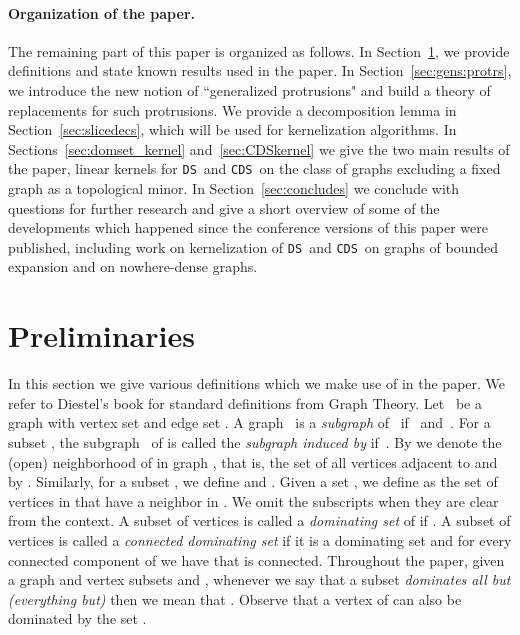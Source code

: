 \documentclass[11pt]{article}
\newcommand{\tDS}{{\texttt{\sc DS}}}
\newcommand{\tCDS}{{\texttt{\sc CDS}}}
\begin{document}
\paragraph{Organization of the paper.}
The remaining part of this paper is organized as follows.
In Section~\ref{sec:defs_and_nots}, we provide definitions and  state known results used in the paper. In Section~\ref{sec:gens:protrs}, we introduce the new notion of ``generalized protrusions" and build a theory of  replacements for such protrusions. 
We provide a decomposition lemma in Section~\ref{sec:slicedecs}, which will be used  for kernelization algorithms. In Sections~\ref{sec:domset_kernel} and~\ref{sec:CDSkernel} we give the two main results of the paper, linear kernels for \tDS\ and \tCDS\ on  the class of graphs excluding a fixed graph  as a topological minor. In Section~\ref{sec:concludes}  we conclude with questions for further research and give a  short overview of some of the developments which happened since the conference versions of this paper were published, including work on  kernelization of \tDS\ and \tCDS\ on graphs of bounded expansion and on nowhere-dense graphs. 


\section{Preliminaries}
\label{sec:defs_and_nots}


In this section we give various definitions which we make use of in the paper. We refer to Diestel's book 
\cite{diestelbook} for standard definitions from Graph Theory.
 Let~ be a graph with vertex set  and edge set .  A graph~ is a
 \emph{subgraph} of~ if~ and~.
 For a subset , the subgraph~ of  is called the   \emph{subgraph induced  by }  if~.
By 
we denote the (open) neighborhood of  in graph , that is, the set of all vertices
adjacent to  and by . 
Similarly, for a subset , we define 
and .  Given a set , we define  as the set of vertices in 
 that have a neighbor in .  We omit the subscripts when they are clear from the context. A subset of vertices  is called a {\em dominating set} of  if 
. A subset of vertices   is called a {\em connected dominating set} if it is a dominating set and for every connected component  of  we have that  is connected. Throughout the paper, given a graph  and vertex subsets  and , whenever we say that a subset  
{\em dominates all but (everything but)}  then we mean that . Observe that a vertex of  can also be dominated by the set . 


\medskip
\end{document}
